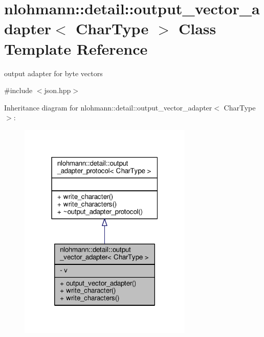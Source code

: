 \hypertarget{classnlohmann_1_1detail_1_1output__vector__adapter}{}\section{nlohmann\+:\+:detail\+:\+:output\+\_\+vector\+\_\+adapter$<$ Char\+Type $>$ Class Template Reference}
\label{classnlohmann_1_1detail_1_1output__vector__adapter}


output adapter for byte vectors  




{\ttfamily \#include $<$json.\+hpp$>$}



Inheritance diagram for nlohmann\+:\+:detail\+:\+:output\+\_\+vector\+\_\+adapter$<$ Char\+Type $>$\+:
\nopagebreak
\begin{figure}[H]
\begin{center}
\leavevmode
\includegraphics[width=235pt]{classnlohmann_1_1detail_1_1output__vector__adapter__inherit__graph}
\end{center}
\end{figure}


